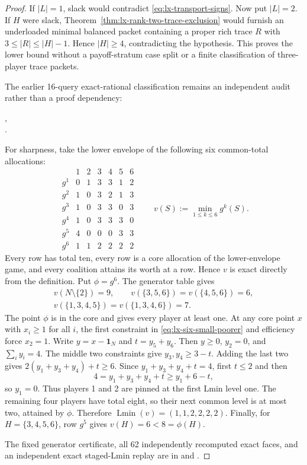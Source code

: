 \begin{proof}
If $|L|=1$, slack would contradict
\eqref{eq:lx-transport-signs}.  Now put $|L|=2$.  If $H$ were slack,
Theorem~\ref{thm:lx-rank-two-trace-exclusion} would furnish an underloaded
minimal balanced packet containing a proper rich trace $R$ with
$3\leq|R|\leq|H|-1$.  Hence $|H|\geq4$, contradicting the hypothesis.
This proves the lower bound without a payoff-stratum case split or a finite
classification of three-player trace packets.

The earlier 16-query exact-rational classification remains an independent
audit rather than a proof dependency:
\begin{center}
\small{},\\[-2pt]
\small{}.
\end{center}

For sharpness, take the lower envelope of the following six common-total
allocations:
\[
\begin{array}{c|rrrrrr}
 &1&2&3&4&5&6\\ \hline
g^1&0&1&3&3&1&2\\
g^2&1&0&3&2&1&3\\
g^3&1&0&3&3&0&3\\
g^4&1&0&3&3&3&0\\
g^5&4&0&0&0&3&3\\
g^6&1&1&2&2&2&2
\end{array}
\qquad
v(S):=\min_{1\leq k\leq6}g^k(S).
\]
Every row has total ten, every row is a core allocation of the lower-envelope
game, and every coalition attains its worth at a row.  Hence $v$ is exact
directly from the definition.  Put $\phi=g^6$.  The generator table gives
\[
\begin{gathered}
v(N\setminus\{2\})=9,\qquad
v(\{3,5,6\})=v(\{4,5,6\})=6,\\
v(\{1,3,4,5\})=v(\{1,3,4,6\})=7.
\end{gathered}                                      \tag{S6}
\label{eq:lx-six-small-poorer}
\]
The point $\phi$ is in the core and gives every player at least one.  At any
core point $x$ with $x_i\geq1$ for all $i$, the first constraint in
\eqref{eq:lx-six-small-poorer} and efficiency force $x_2=1$.  Write
$y=x-\mathbf1_N$ and $t=y_5+y_6$.  Then $y\geq0$, $y_2=0$, and
$\sum_i y_i=4$.  The middle two constraints give
$y_3,y_4\geq3-t$.  Adding the last two gives
$2(y_1+y_3+y_4)+t\geq6$.  Since
$y_1+y_3+y_4+t=4$, first $t\leq2$ and then
\[
4=y_1+y_3+y_4+t\geq y_1+6-t,
\]
so $y_1=0$.  Thus players 1 and 2 are pinned at the first Lmin level one.
The remaining four players have total eight, so their next common level is at
most two, attained by $\phi$.  Therefore
$\operatorname{Lmin}(v)=(1,1,2,2,2,2)$.  Finally, for
$H=\{3,4,5,6\}$, row $g^5$ gives $v(H)=6<8=\phi(H)$.

The fixed generator certificate, all 62 independently recomputed exact faces,
and an independent exact staged-Lmin replay are in
 and
.
\end{proof}

